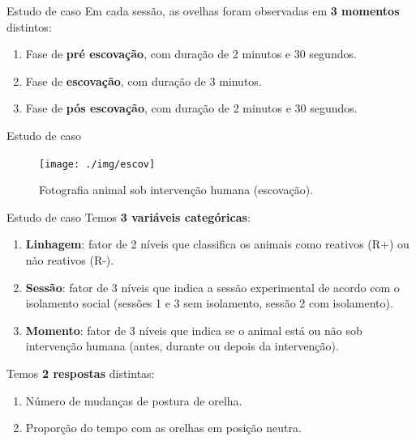 \documentclass[
  ignorenonframetext,
  serif,
  professionalfont,
  usenames,
  dvipsnames,
  aspectratio = 169]{beamer}
\providecommand{\tightlist}{%
  \setlength{\itemsep}{0pt}\setlength{\parskip}{0pt}}
\renewcommand{\tightlist}{%
  \setlength{\itemsep}{0\baselineskip}
  \setlength{\parskip}{0.25\baselineskip}
}
\begin{document}
\begin{frame}{Estudo de caso}
\protect\hypertarget{estudo-de-caso-7}{}
Em cada sessão, as ovelhas foram observadas em \textbf{3 momentos}
distintos:

\begin{enumerate}
\item
  Fase de \textbf{pré escovação}, com duração de 2 minutos e 30
  segundos.
\item
  Fase de \textbf{escovação}, com duração de 3 minutos.
\item
  Fase de \textbf{pós escovação}, com duração de 2 minutos e 30
  segundos.
\end{enumerate}
\end{frame}

\begin{frame}{Estudo de caso}
\protect\hypertarget{estudo-de-caso-8}{}
\begin{figure}

{\centering \texttt{[image: ./img/escov]} 

}

\caption{Fotografia animal sob intervenção humana (escovação).}\label{fig:unnamed-chunk-8}
\end{figure}
\end{frame}

\begin{frame}{Estudo de caso}
\protect\hypertarget{estudo-de-caso-9}{}
Temos \textbf{3 variáveis categóricas}:

\begin{enumerate}
\item
  \textbf{Linhagem}: fator de 2 níveis que classifica os animais como
  reativos (R+) ou não reativos (R-).
\item
  \textbf{Sessão}: fator de 3 níveis que indica a sessão experimental de
  acordo com o isolamento social (sessões 1 e 3 sem isolamento, sessão 2
  com isolamento).
\item
  \textbf{Momento}: fator de 3 níveis que indica se o animal está ou não
  sob intervenção humana (antes, durante ou depois da intervenção).
\end{enumerate}

Temos \textbf{2 respostas} distintas:

\begin{enumerate}
\tightlist
\item
  Número de mudanças de postura de orelha.
\item
  Proporção do tempo com as orelhas em posição neutra.
\end{enumerate}
\end{frame}
\end{document}
